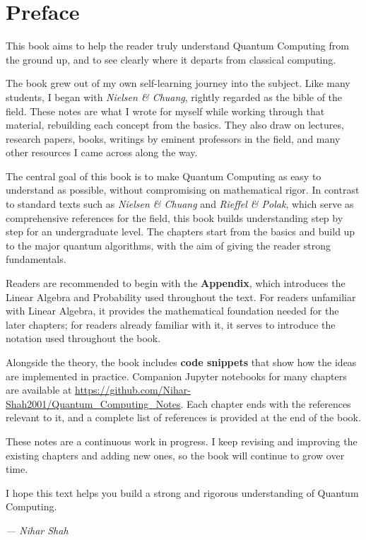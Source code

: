 \chapter*{Preface}

This book aims to help the reader truly understand Quantum Computing from the
ground up, and to see clearly where it departs from classical computing.


The book grew out of my own self-learning journey into the subject. Like many
students, I began with \textit{Nielsen \& Chuang}, rightly regarded as the bible
of the field. These notes are what I wrote for myself while working through that
material, rebuilding each concept from the basics. They also draw on lectures,
research papers, books, writings by eminent professors in the field, and many
other resources I came across along the way.

The central goal of this book is to make Quantum Computing as easy to understand
as possible, without compromising on mathematical rigor. In contrast to standard
texts such as \textit{Nielsen \& Chuang} and \textit{Rieffel \& Polak}, which
serve as comprehensive references for the field, this book builds understanding
step by step for an undergraduate level. The chapters start from the basics and
build up to the major quantum algorithms, with the aim of giving the reader
strong fundamentals.

Readers are recommended to begin with the \textbf{Appendix}, which introduces the
Linear Algebra and Probability used throughout the text. For readers unfamiliar with
Linear Algebra, it provides the mathematical foundation needed for the later
chapters; for readers already familiar with it, it serves to introduce the
notation used throughout the book.

Alongside the theory, the book includes \textbf{code snippets} that show how the
ideas are implemented in practice. Companion Jupyter notebooks for many chapters
are available at
\url{https://github.com/Nihar-Shah2001/Quantum_Computing_Notes}. Each chapter
ends with the references relevant to it, and a complete list of references is
provided at the end of the book.

These notes are a continuous work in progress. I keep revising and improving the
existing chapters and adding new ones, so the book will continue to grow over
time.

I hope this text helps you build a strong and rigorous understanding of Quantum
Computing.

\begin{flushright}
\textit{--- Nihar Shah}
\end{flushright}
